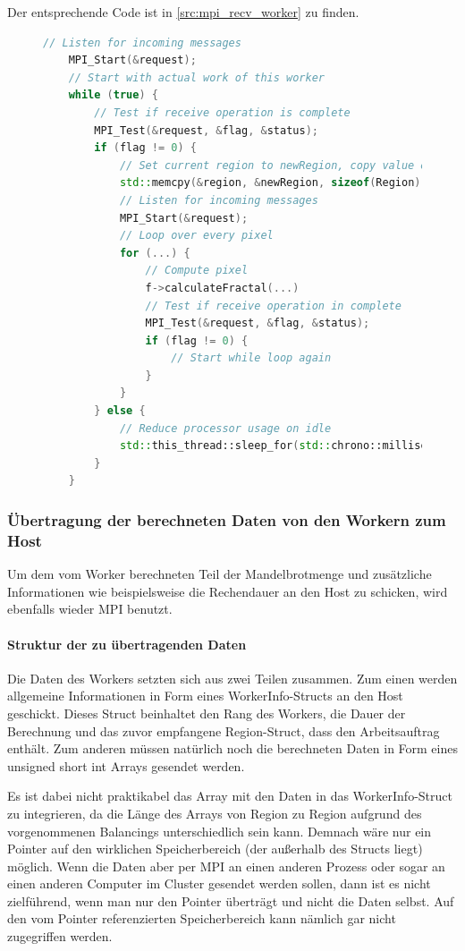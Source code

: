 Der entsprechende Code ist in \autoref{src:mpi_recv_worker} zu finden.

\begin{figure}[h!]
	\begin{lstlisting}[language=c++, caption={Empfangen neuer Rechenaufträge im Worker}, label={src:mpi_recv_worker}, firstnumber=59]
	// Listen for incoming messages
	MPI_Start(&request);
	// Start with actual work of this worker
	while (true) {
		// Test if receive operation is complete
		MPI_Test(&request, &flag, &status);
		if (flag != 0) {
			// Set current region to newRegion, copy value explicitly
			std::memcpy(&region, &newRegion, sizeof(Region));
			// Listen for incoming messages
			MPI_Start(&request);
			// Loop over every pixel
			for (...) {
				// Compute pixel
				f->calculateFractal(...)
				// Test if receive operation in complete
				MPI_Test(&request, &flag, &status);
				if (flag != 0) {
					// Start while loop again
				}
			}
		} else {
			// Reduce processor usage on idle
			std::this_thread::sleep_for(std::chrono::milliseconds(1));
		}
	}
	\end{lstlisting}
\end{figure}

\subsubsection{Übertragung der berechneten Daten von den Workern zum Host}

Um dem vom Worker berechneten Teil der Mandelbrotmenge und zusätzliche Informationen wie beispielsweise die Rechendauer an den Host zu schicken, wird ebenfalls wieder MPI benutzt.

\paragraph{Struktur der zu übertragenden Daten}\label{para:struktur_daten}

Die Daten des Workers setzten sich aus zwei Teilen zusammen. Zum einen werden allgemeine Informationen in Form eines WorkerInfo-Structs an den Host geschickt. Dieses Struct beinhaltet den Rang des Workers, die Dauer der Berechnung und das zuvor empfangene Region-Struct, dass den Arbeitsauftrag enthält. Zum anderen müssen natürlich noch die berechneten Daten in Form eines unsigned short int Arrays gesendet werden.

Es ist dabei nicht praktikabel das Array mit den Daten in das WorkerInfo-Struct zu integrieren, da die Länge des Arrays von Region zu Region aufgrund des vorgenommenen Balancings unterschiedlich sein kann. Demnach wäre nur ein Pointer auf den wirklichen Speicherbereich (der außerhalb des Structs liegt) möglich. Wenn die Daten aber per MPI an einen anderen Prozess oder sogar an einen anderen Computer im Cluster gesendet werden sollen, dann ist es nicht zielführend, wenn man nur den Pointer überträgt und nicht die Daten selbst. Auf den vom Pointer referenzierten Speicherbereich kann nämlich gar nicht zugegriffen werden.

